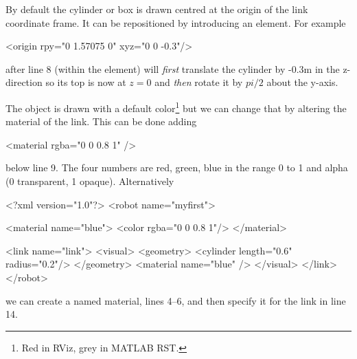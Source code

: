 \documentclass[9pt,fleqn,a4paper]{article}
\begin{document}
By default the cylinder or box is drawn centred at the origin of the link coordinate frame.  It can be repositioned by introducing an
 element.  For example 
\begin{XML}
      <origin rpy="0 1.57075 0" xyz="0 0 -0.3"/>
\end{XML}
after line 8 (within the  element) will \emph{first} translate the cylinder by -0.3\unit{m} in the z-direction so its top is now at $z=0$ and
\emph{then} rotate it by $pi/2$ about the y-axis.

The object is drawn with a default color\footnote{Red in RViz, grey in MATLAB RST.} 
but we can change that by altering the material of the link.
This can be done adding
\begin{XML}
      <material rgba="0 0 0.8 1" />    
\end{XML}
below line 9.  The four numbers are red, green, blue in the range 0 to 1 and alpha (0 transparent, 1 opaque).
Alternatively 
\begin{XMLNum}
<?xml version="1.0"?>
<robot name="myfirst">

  <material name="blue">
    <color rgba="0 0 0.8 1"/>
  </material>

  <link name="link">
    <visual>
      <geometry>
        <cylinder length="0.6" radius="0.2"/>
      </geometry>
      <material name="blue" />
    </visual>
  </link>
</robot>
\end{XMLNum}
we can create a named material, lines 4--6, and then specify it for the link in line 14.


\end{document}
